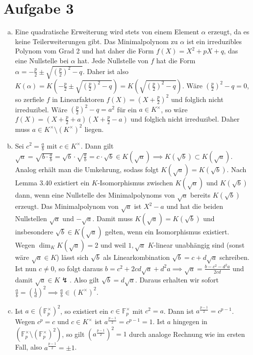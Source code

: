 \documentclass{article}
\begin{document}
    \section*{Aufgabe 3}
    \begin{enumerate}[(a)]
        \item Eine quadratische Erweiterung wird stets von einem Element $\alpha$ erzeugt, da es keine Teilerweiterungen gibt. Das Minimalpolynom zu $\alpha$ ist ein irreduzibles Polynom vom Grad 2 und hat daher die Form $f(X) = X^2 + pX + q$, das eine Nullstelle bei $\alpha$ hat. Jede Nullstelle von $f$ hat die Form $\alpha = -\frac{p}{2} \pm \sqrt{\left(\frac{p}{2}\right)^2 - q}$. Daher ist also $K(\alpha) = K(-\frac{p}{2} \pm \sqrt{\left(\frac{p}{2}\right)^2 - q}) = K(\sqrt{\left(\frac{p}{2}\right)^2 - q})$. Wäre $\left(\frac{p}{2}\right)^2 - q = 0$, so zerfiele $f$ in Linearfaktoren $f(X) = (X + \frac{p}{2})^2$ und folglich nicht irreduzibel. Wäre $\left(\frac{p}{2}\right)^2 - q = a^2$ für ein $a \in K^\times$, so wäre $f(X) = (X + \frac{p}{2} + a)(X + \frac{p}{2} - a)$ und folglich nicht irreduzibel. Daher muss $a \in K^\times \setminus (K^\times)^2$ liegen.
        \item Sei $c^2 = \frac{a}{b}$ mit $c \in K^\times$. Dann gilt $\sqrt{a} = \sqrt{b \cdot \frac{a}{b}} = \sqrt{b} \cdot \sqrt{\frac{a}{b}} = c \cdot \sqrt{b} \in K(\sqrt{a}) \implies K(\sqrt{b}) \subset K(\sqrt{a})$. Analog erhält man die Umkehrung, sodass folgt $K(\sqrt{a}) = K(\sqrt{b})$.
        Nach Lemma 3.40 existiert ein $K$-Isomorphismus zwischen $K(\sqrt{a})$ und $K(\sqrt{b})$ dann, wenn eine Nullstelle des Minimalpolynoms von $\sqrt{a}$ bereits $K(\sqrt{b})$ erzeugt. Das Minimalpolynom von $\sqrt{a}$ ist $X^2 - a$ und hat die beiden Nullstellen $\sqrt{a}$ und $-\sqrt{a}$. Damit muss $K(\sqrt{a}) = K(\sqrt{b})$ und insbesondere $\sqrt{b} \in K(\sqrt{a})$ gelten, wenn ein Isomorphismus existiert. Wegen $\dim_K K(\sqrt{a}) = 2$ und weil $1, \sqrt{a}$ $K$-linear unabhängig sind (sonst wäre $\sqrt{a} \in K$) lässt sich $\sqrt{b}$ als Linearkombination $\sqrt{b} = c + d\sqrt{a}$ schreiben. Ist nun $c \neq 0$, so folgt daraus $b = c^2 + 2cd\sqrt{a} + d^2a \implies \sqrt{a} = \frac{b - c^2 - d^2a}{2cd}$ und damit $\sqrt{a} \in K \lightning$. Also gilt $\sqrt{b} = d\sqrt{a}$. Daraus erhalten wir sofort $\frac{a}{b} = \left(\frac{1}{d}\right)^2 \implies \frac{a}{b} \in (K^\times)^2$.
        \item Ist $a \in (\mathbb{F}_p^\times)^2$, so existiert ein $c \in \mathbb{F}_p^\times$ mit $c^2 = a$. Dann ist $a^{\frac{p-1}{2}} = c^{p-1}$. Wegen $c^p = c$ und $c \in K^\times$ ist $a^{\frac{p-1}{2}} =  c^{p-1} = 1$. Ist $a$ hingegen in $(\mathbb{F}_p^\times \setminus (\mathbb{F}_p^\times)^2)$, so gilt $(a^{\frac{p-1}{2}})^2 = 1$ durch analoge Rechnung wie im ersten Fall, also $a^{\frac{p-1}{2}} = \pm 1$.

\end{enumerate}
\end{document}
